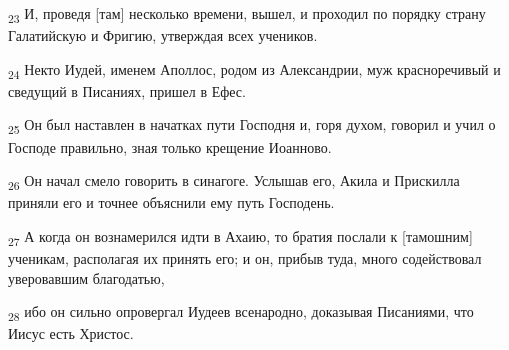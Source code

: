 \begin{tcolorbox}
\textsubscript{23} И, проведя [там] несколько времени, вышел, и проходил по порядку страну Галатийскую и Фригию, утверждая всех учеников.
\end{tcolorbox}
\begin{tcolorbox}
\textsubscript{24} Некто Иудей, именем Аполлос, родом из Александрии, муж красноречивый и сведущий в Писаниях, пришел в Ефес.
\end{tcolorbox}
\begin{tcolorbox}
\textsubscript{25} Он был наставлен в начатках пути Господня и, горя духом, говорил и учил о Господе правильно, зная только крещение Иоанново.
\end{tcolorbox}
\begin{tcolorbox}
\textsubscript{26} Он начал смело говорить в синагоге. Услышав его, Акила и Прискилла приняли его и точнее объяснили ему путь Господень.
\end{tcolorbox}
\begin{tcolorbox}
\textsubscript{27} А когда он вознамерился идти в Ахаию, то братия послали к [тамошним] ученикам, располагая их принять его; и он, прибыв туда, много содействовал уверовавшим благодатью,
\end{tcolorbox}
\begin{tcolorbox}
\textsubscript{28} ибо он сильно опровергал Иудеев всенародно, доказывая Писаниями, что Иисус есть Христос.
\end{tcolorbox}
